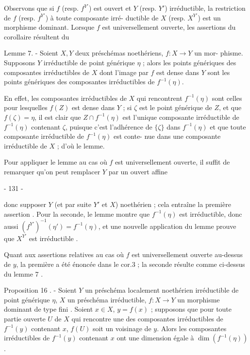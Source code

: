 Observons que si $f$ (resp. $f^{Y'}$) est ouvert et $Y$ (resp. $Y'$) irréductible,
la restriction de $f$ (resp. $f^{Y'}$) à toute composante irré-
ductible de $X$ (resp. $X^{Y'}$) est un morphisme dominant. Lorsque $f$
est universellement ouverte, les assertions du corollaire résultent
du

Lemme 7. - Soient $X, Y$ deux préschémas noethériens, $f : X \to Y$ un mor-
phisme. Supposons $Y$ irréductible de point générique $\eta$ ; alors les
points génériques des composantes irréductibles de $X$ dont l'image
par $f$ est dense dans $Y$ sont les points génériques des composantes
irréductibles de $f^{-1}(\eta)$.

En effet, les composantes irréductibles de $X$ qui rencontrent $f^{-1}(\eta)$
sont celles pour lesquelles $f(Z)$ est dense dans $Y$ ; si $\zeta$ est le point
générique de $Z$, et que $f(\zeta) = \eta$, il est clair que $Z \cap f^{-1}(\eta)$ est l'unique
composante irréductible de $f^{-1}(\eta)$ contenant $\zeta$, puisque c'est l'adhérence de $\{\zeta\}$
dans $f^{-1}(\eta)$ et que toute composante irréductible de $f^{-1}(\eta)$ est conte-
nue dans une composante irréductible de $X$ ; d'où le lemme.

Pour appliquer le lemme au cas où $f$ est universellement ouverte, il
suffit de remarquer qu'on peut remplacer $Y$ par un ouvert affine

\newpage


- 131 -

donc supposer $Y$ (et par suite $Y'$ et $X$) noethérien ; cela entraîne la première assertion . Pour la seconde, le lemme montre que $f^{-1}(\eta)$ est irréductible, donc aussi $(f^{Y'})^{-1}(\eta') = f^{-1}(\eta)$, et une nouvelle application du lemme prouve que $X^{Y'}$ est irréductible .

Quant aux assertions relatives au cas où $f$ est universellement ouverte au-dessus de $y$, la première a été énoncée dans le cor.3 ; la seconde résulte comme ci-dessus du lemme 7 .

\medskip
\noindent
Proposition 16 . - Soient $Y$ un préschéma localement noethérien irréductible de point générique $\eta$, $X$ un préschéma irréductible, $f : X \to Y$ un morphisme dominant de type fini . Soient $x \in X$, $y=f(x)$ ; supposons que pour toute partie ouverte $U$ de $X$ qui rencontre une des composantes irréductibles de $f^{-1}(y)$ contenant $x$, $f(U)$ soit un voisinage de $y$. Alors les composantes irréductibles de $f^{-1}(y)$ contenant $x$ ont une dimension égale à $\dim(f^{-1}(\eta))$.

